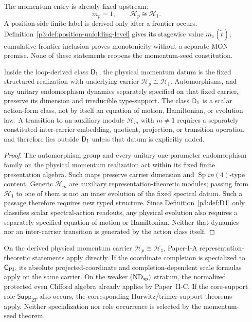 \documentclass[12pt,a4paper]{article}
\begin{document}
\begin{remark}
\label{p3:rem:mp-mx-distinction}
The momentum entry is already fixed upstream:
\[
 m_p=1,
 \qquad
 \mathcal H_p\cong\mathcal H_1.
\]
A position-side finite label is derived only after a frontier occurs.
Definition~\ref{p3:def:position-unfolding-level} gives its stagewise value
\(m_x(\widetilde t)\); cumulative frontier inclusion proves monotonicity
without a separate MON premise.  None of these statements reopens the
momentum-seed constitution.
\end{remark}

\begin{theorem}
\label{p3:thm:no-momentum-m-flow}
Inside the loop-derived class \(\mathsf{D}_1\), the physical momentum datum is the fixed
structured realization with underlying carrier \(\mathcal H_p\cong\mathcal H_1\).
Automorphisms, and any unitary endomorphism dynamics separately specified on
that fixed carrier, preserve its dimension and irreducible type-support.  The
class \(\mathsf{D}_1\) is a scalar action-form class, not by itself an equation of
motion, Hamiltonian, or evolution law.  A transition to an auxiliary module
\(\mathcal H_m\) with \(m\ne1\) requires a separately constituted
inter-carrier embedding, quotient, projection, or transition operation and
therefore lies outside \(\mathsf{D}_1\) unless that datum is explicitly added.
\end{theorem}

\begin{proof}
The automorphism group and every unitary one-parameter endomorphism family on
the physical momentum realization act within its fixed finite presentation
algebra.  Such maps preserve carrier dimension and \(\operatorname{Sp}in(4)\)-type content.
Generic \(\mathcal H_m\) are auxiliary
representation-theoretic modules; passing from \(\mathcal H_1\) to one of
them is not an inner evolution of the fixed spectral datum.  Such a passage
therefore requires new typed structure.  Since Definition~\ref{p3:def:D1}
only classifies scalar spectral-action readouts, any physical evolution also
requires a separately specified equation of motion or Hamiltonian.  Neither
that dynamics nor an inter-carrier transition is generated by the action
class itself.
\end{proof}

\begin{proposition}
\label{p3:prop:postselection-finite-cell-imports}
On the derived physical momentum carrier \(\mathcal H_p\cong\mathcal H_1\),
Paper-I-A representation-theoretic statements apply directly.  If the coordinate completion is specialized to \(\mathsf C_{\rm PI}\),
its absolute projected-coordinate and completion-dependent scale formulas
apply on the same carrier.  On the weaker \((\mathrm{ND}_{\rm sp})\)
stratum, the normalized protected even Clifford algebra already applies by
Paper~II-C.  If the core-support role \(\mathsf{Supp}_{2T}\) also occurs, the corresponding
Hurwitz/trimer support theorems apply.  Neither specialization nor role
occurrence is selected by the momentum-seed theorem.
\end{proposition}
\end{document}
